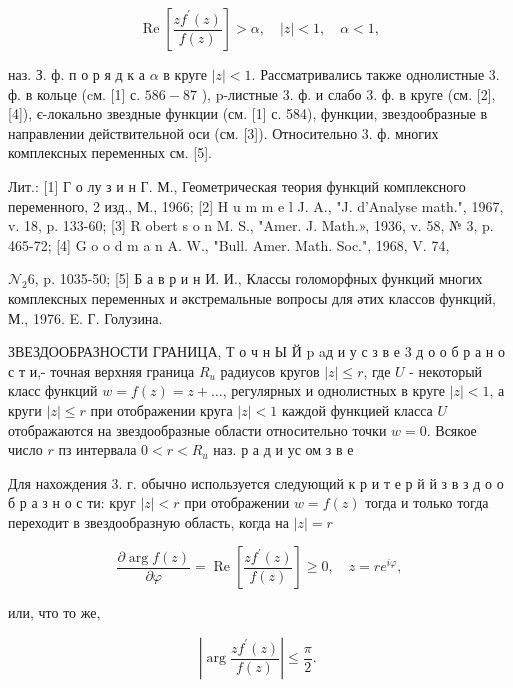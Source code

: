\documentclass[10pt]{article}
\begin{document}
\[

\operatorname{Re}\left[\frac{z f^{\prime}(z)}{f(z)}\right]>\alpha, \quad|z|<1, \quad \alpha<1,

\]



наз. З. ф. п о р я д к а $\alpha$ в круге $|z|<1$. Рассматривались также однолистные 3. ф. в кольце (cм. [1] с. $586-87$ ), p-листные 3. ф. и слабо 3. ф. в круге (см. [2], [4]), є-локально звездные функции (см. [1] с. 584), функции, звездообразные в направлении действительной оси (см. [3]). Относительно 3. ф. многих комплексных переменных см. [5].



Лит.: [1] Г о лу з и н Г. М., Геометрическая теория функций комплексного переменного, 2 изд., М., 1966; [2] H u m m e l J. A., "J. d'Analyse math.", 1967, v. 18, p. 133-60; [3] R obert s o n M. S., "Amer. J. Math.», 1936, v. 58, № 3, p. 465-72; [4] G o o d m a n A. W., "Bull. Amer. Math. Soc.", 1968, V. 74,

$\mathcal{N}_{2} 6$, p. 1035-50; [5] Б а в р и н И. И., Классы голоморфных функций многих комплексных переменных и әкстремальные вопросы для әтих классов функций, М., 1976. E. Г. Голузина.



ЗВЕЗДООБРАЗНОСТИ ГРАНИЦА, Т о ч н Ы Й p aд и у с з в е 3 д о о б р а н о с т и,- точная верхняя граница $R_{u}$ радиусов кругов $|z| \leqslant r$, где $U$ - некоторый класс функций $w=f(z)=z+\ldots$, регулярных и однолистных в круге $|z|<1$, а круги $|z| \leqslant r$ при отображении круга $|z|<1$ каждой функцией класса $U$ отображаются на звездообразные области относительно точки $w=0$. Всякое число $r$ пз интервала $0<r<R_{u}$ наз. р а д и ус ом з в е



Для нахождения 3. г. обычно используется следующий к р и т е р й й з в з д о о б р а з н о с ти: круг $|z|<r$ при отображении $w=f(z)$ тогда и только тогда переходит в звездообразную область, когда на $|z|=r$



\[

\frac{\partial \arg f(z)}{\partial \varphi}=\operatorname{Re}\left[\frac{z f^{\prime}(z)}{f(z)}\right] \geqslant 0, \quad z=r e^{i \varphi},

\]



или, что то же,



\[

\left|\arg \frac{z f^{\prime}(z)}{f(z)}\right| \leqslant \frac{\pi}{2} \text {. }

\]
\end{document}

